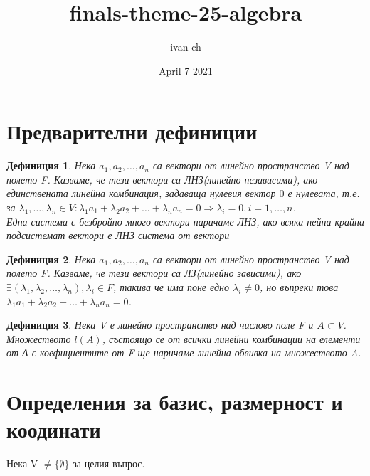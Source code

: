 \documentclass[fleqn,12pt]{article}
\title{finals-theme-25-algebra}
\author{ivan ch}
\date{April 7 2021}
\newtheorem*{Def}{Дефиниция}
\begin{document}
\maketitle

\tableofcontents

\begin{justify}

\section{Предварителни дефиниции}
\begin{Def}
    Нека $a_1, a_2, \dots, a_n$ са вектори от линейно пространство V над полето F. Казваме, че тези
    вектори са ЛНЗ(линейно независими), ако единствената линейна комбинация, задаваща нулевия вектор
    $0$ е нулевата, т.е. за $\lambda_1, \dots, \lambda_n \in V : \lambda_1 a_1 + \lambda_2 a_2 + \dots +
    \lambda_n a_n = 0 \Rightarrow \lambda_i = 0, i = 1,\dots,n$.\\
    Една система с безбройно много вектори наричаме ЛНЗ, ако всяка нейна крайна подсистемат вектори е ЛНЗ система от
    вектори
\end{Def}
\begin{Def}
    Нека $a_1,a_2,\dots,a_n$ са вектори от линейно пространство V над полето F. Казваме, че тези
    вектори са ЛЗ(линейно зависими), ако $\exists(\lambda_1,\lambda_2,\dots,\lambda_n), \lambda_i \in
    F$, такива че има поне едно $\lambda_i \neq 0$, но въпреки това \\
    $\lambda_1 a_1 + \lambda_2 a_2 + \dots + \lambda_n a_n = 0$.
\end{Def}
\begin{Def}
    Нека V е линейно пространство над числово поле F и $A \subset V$. Множеството $l(A)$, състоящо
    се от всички линейни комбинации на елементи от А с коефициентите от F ще наричаме линейна
    обвивка на множеството A.
\end{Def}

\section{Определения за базис, размерност и коодинати}
Нека V $ \neq \{\emptyset\}$ за целия въпрос.

\end{justify}
\end{document}
